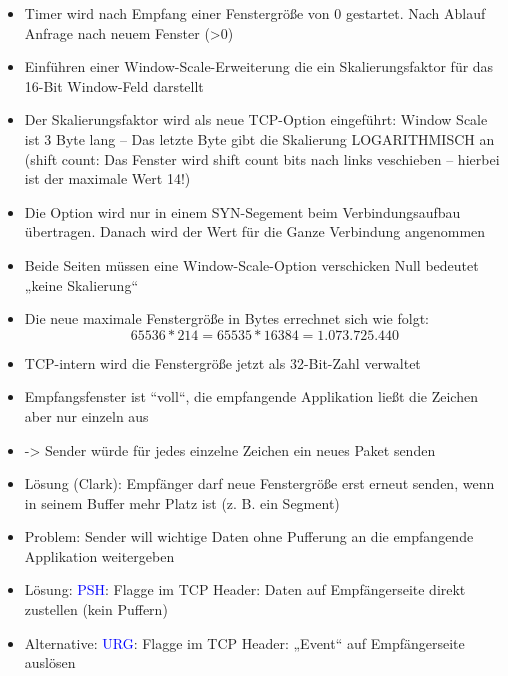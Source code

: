 \begin{itemize}
    \item Timer wird nach Empfang einer Fenstergröße von 0 gestartet.
    Nach Ablauf Anfrage nach neuem Fenster (>0)
\end{itemize}

\begin{itemize}
    \item Einführen einer Window-Scale-Erweiterung die ein Skalierungsfaktor für das 16-Bit Window-Feld darstellt
    \item Der Skalierungsfaktor wird als neue TCP-Option eingeführt: Window Scale ist 3 Byte lang – Das letzte Byte gibt die Skalierung LOGARITHMISCH an (shift count: Das Fenster wird shift count bits nach links veschieben – hierbei ist der maximale Wert 14!)
    \item Die Option wird nur in einem SYN-Segement beim Verbindungsaufbau übertragen.
    Danach wird der Wert für die Ganze Verbindung angenommen
    \item Beide Seiten müssen eine Window-Scale-Option verschicken Null bedeutet „keine Skalierung“
    \item Die neue maximale Fenstergröße in Bytes errechnet sich wie folgt: \[65536 * 214 = 65535 * 16384 = 1.073.725.440\]
    \item TCP-intern wird die Fenstergröße jetzt als 32-Bit-Zahl verwaltet
\end{itemize}

\begin{itemize}
    \item Empfangsfenster ist ``voll``, die empfangende Applikation ließt die Zeichen aber nur einzeln aus
    \item -> Sender würde für jedes einzelne Zeichen ein neues Paket senden
    \item Lösung (Clark): Empfänger darf neue Fenstergröße erst erneut senden, wenn in seinem Buffer mehr Platz ist (z. B. ein Segment)
\end{itemize}

\begin{itemize}
    \item Problem: Sender will wichtige Daten ohne Pufferung an die empfangende Applikation weitergeben
    \item Lösung: \textcolor{blue}{PSH}: Flagge im TCP Header: Daten auf Empfängerseite direkt zustellen (kein Puffern)
    \item Alternative: \textcolor{blue}{URG}: Flagge im TCP Header: „Event“ auf Empfängerseite auslösen
\end{itemize}